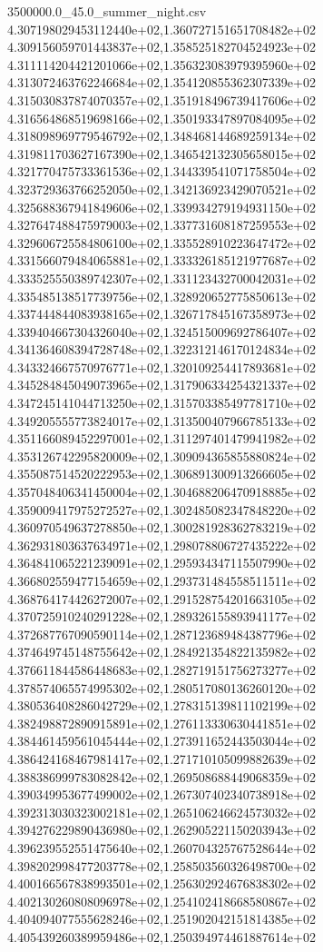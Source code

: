 \begin{filecontents*}{3500000.0_45.0_summer_night.csv}
4.307198029453112440e+02,1.360727151651708482e+02
4.309156059701443837e+02,1.358525182704524923e+02
4.311114204421201066e+02,1.356323083979395960e+02
4.313072463762246684e+02,1.354120855362307339e+02
4.315030837874070357e+02,1.351918496739417606e+02
4.316564868519698166e+02,1.350193347897084095e+02
4.318098969779546792e+02,1.348468144689259134e+02
4.319811703627167390e+02,1.346542132305658015e+02
4.321770475733361536e+02,1.344339541071758504e+02
4.323729363766252050e+02,1.342136923429070521e+02
4.325688367941849606e+02,1.339934279194931150e+02
4.327647488475979003e+02,1.337731608187259553e+02
4.329606725584806100e+02,1.335528910223647472e+02
4.331566079484065881e+02,1.333326185121977687e+02
4.333525550389742307e+02,1.331123432700042031e+02
4.335485138517739756e+02,1.328920652775850613e+02
4.337444844083938165e+02,1.326717845167358973e+02
4.339404667304326040e+02,1.324515009692786407e+02
4.341364608394728748e+02,1.322312146170124834e+02
4.343324667570976771e+02,1.320109254417893681e+02
4.345284845049073965e+02,1.317906334254321337e+02
4.347245141044713250e+02,1.315703385497781710e+02
4.349205555773824017e+02,1.313500407966785133e+02
4.351166089452297001e+02,1.311297401479941982e+02
4.353126742295820009e+02,1.309094365855880824e+02
4.355087514520222953e+02,1.306891300913266605e+02
4.357048406341450004e+02,1.304688206470918885e+02
4.359009417975272527e+02,1.302485082347848220e+02
4.360970549637278850e+02,1.300281928362783219e+02
4.362931803637634971e+02,1.298078806727435222e+02
4.364841065221239091e+02,1.295934347115507990e+02
4.366802559477154659e+02,1.293731484558511511e+02
4.368764174426272007e+02,1.291528754201663105e+02
4.370725910240291228e+02,1.289326155893941177e+02
4.372687767090590114e+02,1.287123689484387796e+02
4.374649745148755642e+02,1.284921354822135982e+02
4.376611844586448683e+02,1.282719151756273277e+02
4.378574065574995302e+02,1.280517080136260120e+02
4.380536408286042729e+02,1.278315139811102199e+02
4.382498872890915891e+02,1.276113330630441851e+02
4.384461459561045444e+02,1.273911652443503044e+02
4.386424168467981417e+02,1.271710105099882639e+02
4.388386999783082842e+02,1.269508688449068359e+02
4.390349953677499002e+02,1.267307402340738918e+02
4.392313030323002181e+02,1.265106246624573032e+02
4.394276229890436980e+02,1.262905221150203943e+02
4.396239552551475640e+02,1.260704325767528644e+02
4.398202998477203778e+02,1.258503560326498700e+02
4.400166567838993501e+02,1.256302924676838302e+02
4.402130260808096978e+02,1.254102418668580867e+02
4.404094077555628246e+02,1.251902042151814385e+02
4.405439260389959486e+02,1.250394974461887614e+02

\end{filecontents*}
